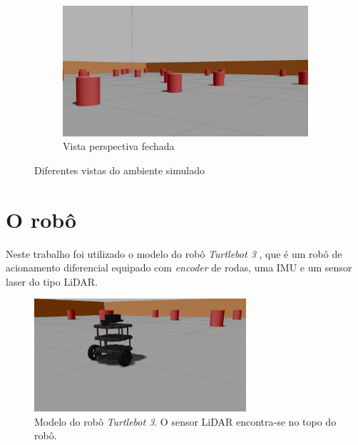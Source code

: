 \begin{figure}[h]
  \hfill
  \begin{subfigure}{\textwidth}
    \centering
    \includegraphics[width=.5\textwidth]{figs/environment-closer-perspective.jpg}
    \caption{Vista perspectiva fechada}
  \end{subfigure}
  \caption{Diferentes vistas do ambiente simulado}
  \label{fig:environment}
\end{figure}

\section{O robô}
Neste trabalho foi utilizado o modelo do robô \emph{Turtlebot 3} \cite{TurtleBot_3}, que é um robô de acionamento diferencial equipado com 
\textit{encoder} de rodas, uma IMU e um sensor laser do tipo LiDAR.
\begin{figure}[h]
  \centering
  \includegraphics[width=0.7\textwidth]{figs/robot-closeup.jpg}
  \caption[Modelo do robô \textit{Turtlebot 3}]{Modelo do robô \textit{Turtlebot 3}. O sensor LiDAR encontra-se no topo do robô.}
  \label{fig:turtlebot-digital-twin}
\end{figure}

